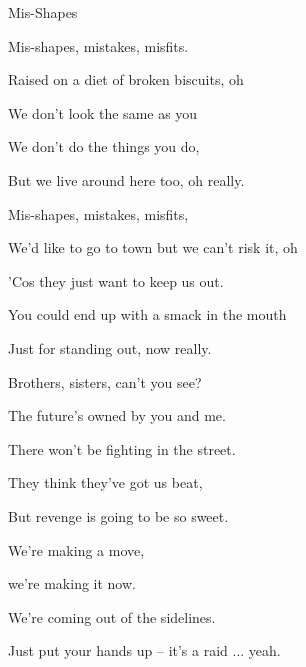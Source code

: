 \begin{song}{Mis-Shapes}{

    \chordset[Verse]{ \AMaj \EMaj \Fshm \DMaj \DSeven}

    \chordset[Chorus]{ \GMaj \GMajSeven \GSeven \CMaj \CMajSeven \CSeven }
	
	\chordset{ \Em \EmSix \EmaddC }

}

	 \begin{songverse}
		Mis-shapes, mistakes, misfits. 

		Raised on a diet of broken biscuits, oh 

		We don't look the same as you 
		
		We don't do the things you do,
		
		But we live around here too, oh really. 
	 \end{songverse}

	 \begin{songverse}
		Mis-shapes, mistakes, misfits,

		We'd like to go to town but we can't risk it, oh \ch{F\#m} 

		'Cos they just want to keep us out. \ch{D}
		
		You could end up with a smack in the mouth

		Just for standing out, now really.
	 \end{songverse}

	 \begin{songverse}

		Brothers, sisters, can't you see? 

		The future's owned by you and me. 

		There won't be fighting in the street. 

		They think they've got us beat, 

		But revenge is going to be so sweet. 
	\end{songverse}

	\begin{songverse}
		
		 \quad We're making a move, 

		we're making it now. 

		We're coming out of the sidelines. 

		\quad Just put your hands up -- it's a raid ... yeah.


\end{songverse}
\end{song}
